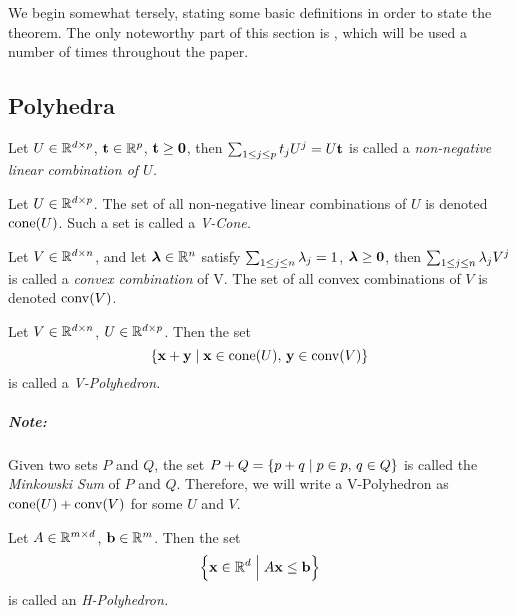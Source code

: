 \chapter{\MWT}

We begin somewhat tersely, stating some basic definitions in order to state the theorem.  The only noteworthy part of this section is , which will be used a number of times throughout the paper.

\section{Polyhedra}

\begin{Def}{
		Let $U \in \mathbb{R}^{d\times p}$, $\mathbf{t} \in \mathbb{R}^{p}$, ${\mathbf{t} \geq \mathbf{0}}$, then \( \sum_{1\leq j \leq p}t_j U^j = U\mathbf{t}\) is called a \em{non-negative linear combination} of $U$.
	}\end{Def}

\begin{Def}[V-Cone]{
		Let $U \in \mathbb{R}^{d\times p}$.  The set of all non-negative linear combinations of $U$ is denoted $\operatorname{cone}(U)$.  Such a set is called a \em{V-Cone}.
	}\end{Def}

\drawVCone

\begin{Def}{
		Let $V \in \mathbb{R}^{d\times n}$, and let $\bm{\lambda} \in \mathbb{R}^{n}$ satisfy $\sum_{1\leq j \leq n}\lambda_j = 1$, $\bm{\lambda} \geq\mathbf{0}$, then \( \sum_{1\leq j \leq n}\lambda_j V^j \) is called a \textit{convex combination} of V.  The set of all convex combinations of $V$ is denoted $\operatorname{conv}(V)$.
	}\end{Def}

\begin{Def}[V-Polyhedron]{
		Let $V \in \mathbb{R}^{d\times n}$, $U \in \mathbb{R}^{d\times p}$.  Then the set
		\[ \left\{\mathbf{x} + \mathbf{y} \;|\; \mathbf{x} \in \operatorname{cone}(U),\, \mathbf{y} \in \operatorname{conv}(V)\right\} \]
		is called a \em{V-Polyhedron}.
	}\end{Def}

\drawVPoly

\paragraph{Note:} Given two sets $P$ and $Q$, the set $P+Q = \left\{p+q\;|\; p\in p,\,q\in Q\right\}$ is called the \textit{Minkowski Sum} of $P$ and $Q$.  Therefore, we will write a V-Polyhedron as $\operatorname{cone}(U) + \operatorname{conv}(V)$ for some $U$ and $V$.\\

\begin{Def}[H-Polyhedron]{
		Let $A \in \mathbb{R}^{{m}\times d}$, $\mathbf{b} \in \mathbb{R}^{m}$.  Then the set
		\[ \left\{\mathbf{x} \in \mathbb{R}^d \;\Big|\; A\mathbf{x} \leq \mathbf{b}\right\} \]
		is called an \em{H-Polyhedron}.
	}\end{Def}

